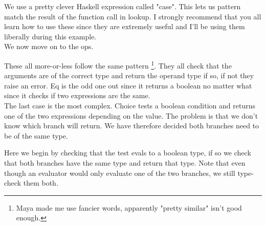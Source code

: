         We use a pretty clever Haskell expression called "case". This lets us pattern match the result of the function call in lookup. 
        I strongly recommend that you all learn how to use these since they are extremely useful and I'll be using them liberally during this example.\\
        We now move on to the ops.
        
        
        These all more-or-less follow the same pattern \footnote{Maya made me use fancier words, apparently "pretty similar" isn't good enough.}.
        They all check that the arguments are of the correct type and return the operand type if so, if not they raise an error.
        Eq is the odd one out since it returns a boolean no matter what since it checks if two expressions are the same.\\
        The last case is the most complex. Choice tests a boolean condition and returns one of the two expressions depending on the value.
        The problem is that we don't know which branch will return. We have therefore decided both branches need to be of the same type.
        
           
        Here we begin by checking that the test evals to a boolean type, if so we check that both branches have the same type and return that type.
        Note that even though an evaluator would only evaluate one of the two branches, we still type-check them both.
